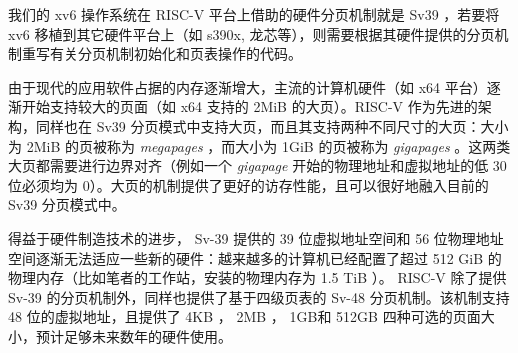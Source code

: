 我们的 xv6 操作系统在 RISC-V 平台上借助的硬件分页机制就是 Sv39 ，若要将 xv6 移植到其它硬件平台上（如 s390x, 龙芯等），则需要根据其硬件提供的分页机制重写有关分页机制初始化和页表操作的代码。

\begin{proposition}
    由于现代的应用软件占据的内存逐渐增大，主流的计算机硬件（如 x64 平台）逐渐开始支持较大的页面（如 x64 支持的 2MiB 的大页）。RISC-V 作为先进的架构，同样也在 Sv39 分页模式中支持大页，而且其支持两种不同尺寸的大页：大小为 2MiB 的页被称为 \textit{megapages} ，而大小为 1GiB 的页被称为 \textit{gigapages} 。这两类大页都需要进行边界对齐（例如一个 \textit{gigapage} 开始的物理地址和虚拟地址的低 30 位必须均为 0）。大页的机制提供了更好的访存性能，且可以很好地融入目前的 Sv39 分页模式中。
\end{proposition}

得益于硬件制造技术的进步， Sv-39 提供的 39 位虚拟地址空间和 56 位物理地址空间逐渐无法适应一些新的硬件：越来越多的计算机已经配置了超过 512 GiB 的物理内存（比如笔者的工作站，安装的物理内存为 1.5 TiB ）。 RISC-V 除了提供 Sv-39 的分页机制外，同样也提供了基于四级页表的 Sv-48 分页机制。该机制支持 48 位的虚拟地址，且提供了 4KB ， 2MB ， 1GB和 512GB 四种可选的页面大小，预计足够未来数年的硬件使用。